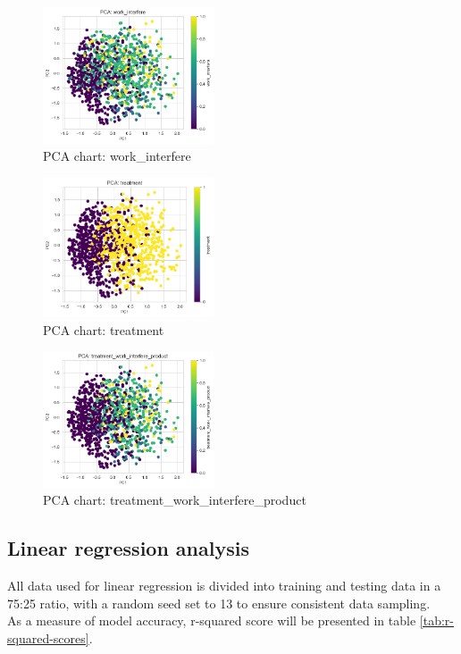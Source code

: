 \documentclass[conference]{IEEEtran}
\begin{document}
\begin{figure}[h]
    \includegraphics[width=0.45\textwidth]{images/pca-work-interfere.png}
    \centering
    \caption{PCA chart: work\_interfere}
\end{figure}
\begin{figure}[h]
    \includegraphics[width=0.45\textwidth]{images/pca-treatment.png}
    \centering
    \caption{PCA chart: treatment}
\end{figure}
\begin{figure}[H]
    \includegraphics[width=0.45\textwidth]{images/pca-product.png}
    \centering
    \caption{PCA chart: treatment\_work\_interfere\_product}
\end{figure}

\subsection{Linear regression analysis}
All data used for linear regression is divided into training and testing data in a 75:25 ratio, with a random seed set to 13 to ensure consistent data sampling.\\
As a measure of model accuracy, r-squared score will be presented in table \ref{tab:r-squared-scores}.
\end{document}
